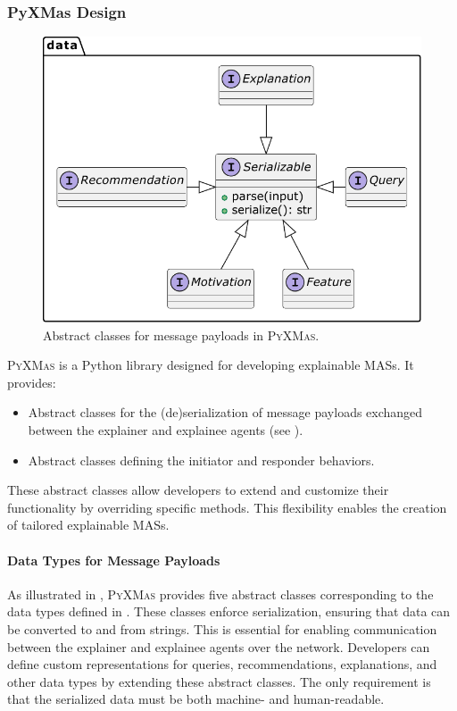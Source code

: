 \subsubsection{PyXMas Design}\label{subsubsec:pyxmas-design}
%
\begin{figure}
    \centering
    \includegraphics[width=0.7\linewidth]{figures/pyxmas/types}
    \caption{
        Abstract classes for message payloads in \textsc{PyXMas}.
    }
    \label{fig:types}
\end{figure}
%
\textsc{PyXMas} is a Python library designed for developing explainable \glspl{MAS}.
%
It provides:
%
\begin{itemize}
    \item Abstract classes for the (de)serialization of message payloads exchanged between the explainer and explainee agents (see ).
    \item Abstract classes defining the initiator and responder behaviors.
\end{itemize}
%
These abstract classes allow developers to extend and customize their functionality by overriding specific methods.
%
This flexibility enables the creation of tailored explainable \glspl{MAS}.
%
\paragraph{Data Types for Message Payloads}
%
As illustrated in , \textsc{PyXMas} provides five abstract classes corresponding to the data types defined in .
%
These classes enforce serialization, ensuring that data can be converted to and from strings.
%
This is essential for enabling communication between the explainer and explainee agents over the network.
%
Developers can define custom representations for queries, recommendations, explanations, and other data types by extending these abstract classes.
%
The only requirement is that the serialized data must be both machine- and human-readable.
%
